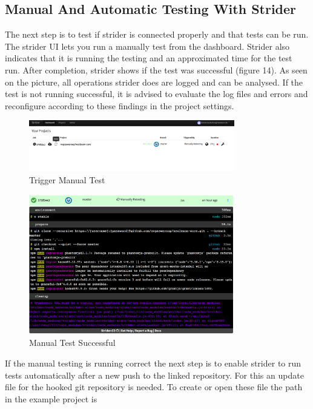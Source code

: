 \subsection{Manual And Automatic Testing With Strider}
\label{Manual And Automatic Testing With Strider}
The next step is to test if strider is connected properly and that tests can be run. The strider UI lets you run a manually test from
the dashboard. Strider also indicates that it is running the testing and an approximated time for the test run. After completion,
strider shows if the test was successful (figure 14). As seen on the picture, all operations strider does are logged and can be
analysed. If the test is not running successful, it is advised to evaluate the log files and errors and reconfigure according to these
findings in the project settings.

\begin{figure}[h!]
  \centering
  \includegraphics[width=0.8\textwidth]{images/manualTest.png}
  \caption{Trigger Manual Test}
\end{figure}

\begin{figure}[h!]
  \centering
  \includegraphics[width=0.8\textwidth]{images/successfulManualTest.png}
  \caption{Manual Test Successful}
\end{figure}

If the manual testing is running correct the next step is to enable strider to run tests automatically after a new push to the
linked repository. For this an update file for the hooked git repository is needed. To create or open these file the path in
the example project is

